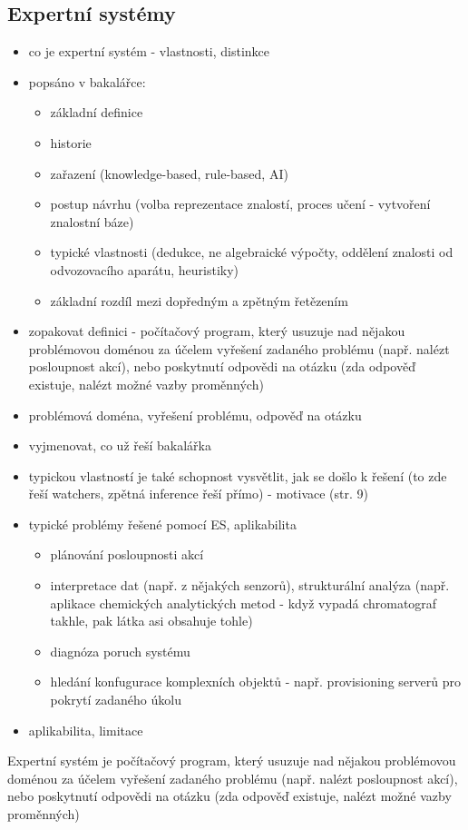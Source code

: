 \subsection{Expertní systémy}

\begin{framed}
  \begin{itemize}
    \item co je expertní systém - vlastnosti, distinkce
    \item popsáno v bakalářce:
      \begin{itemize}
        \item základní definice
        \item historie
        \item zařazení (knowledge-based, rule-based, AI)
        \item postup návrhu (volba reprezentace znalostí, proces učení -
          vytvoření znalostní báze)
        \item typické vlastnosti (dedukce, ne algebraické výpočty, oddělení
          znalosti od odvozovacího aparátu, heuristiky)
        \item základní rozdíl mezi dopředným a zpětným řetězením
      \end{itemize}

    \item zopakovat definici - počítačový program, který usuzuje nad nějakou
      problémovou doménou za účelem vyřešení zadaného problému (např. nalézt
      posloupnost akcí), nebo poskytnutí odpovědi na otázku (zda odpověď
      existuje, nalézt možné vazby proměnných)
    \item problémová doména, vyřešení problému, odpověď na otázku

    \item vyjmenovat, co už řeší bakalářka
    \item typickou vlastností je také schopnost vysvětlit, jak se došlo k
      řešení (to zde řeší watchers, zpětná inference řeší přímo) - motivace
      (str. 9)
    \item typické problémy řešené pomocí ES, aplikabilita
      \begin{itemize}
        \item plánování posloupnosti akcí
        \item interpretace dat (např. z nějakých senzorů), strukturální analýza
          (např. aplikace chemických analytických metod - když vypadá
          chromatograf takhle, pak látka asi obsahuje tohle)
        \item diagnóza poruch systému
        \item hledání konfugurace komplexních objektů - např. provisioning
          serverů pro pokrytí zadaného úkolu
      \end{itemize}
    \item aplikabilita, limitace
  \end{itemize}
\end{framed}

Expertní systém je počítačový program, který usuzuje nad nějakou problémovou
doménou za účelem vyřešení zadaného problému (např. nalézt posloupnost akcí),
nebo poskytnutí odpovědi na otázku (zda odpověď existuje, nalézt možné vazby
proměnných)
